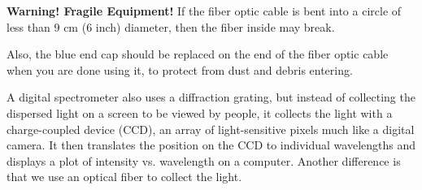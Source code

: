 \begin{framed}
	\textbf{Warning! Fragile Equipment!} If the fiber optic cable is bent into a circle of less than 9 cm (6 inch) diameter, then the fiber inside may break.
	
	Also, the blue end cap should be replaced on the end of the fiber optic cable when you are done using it, to protect from dust and debris entering.
\end{framed}

A digital spectrometer also uses a diffraction grating, but instead of collecting the dispersed light on a screen to be viewed by people, it collects the light with a charge-coupled device (CCD), an array of light-sensitive pixels much like a digital camera. It then translates the position on the CCD to individual wavelengths and displays a plot of intensity vs. wavelength on a computer. %
Another difference is that we use an optical fiber to collect the light.

